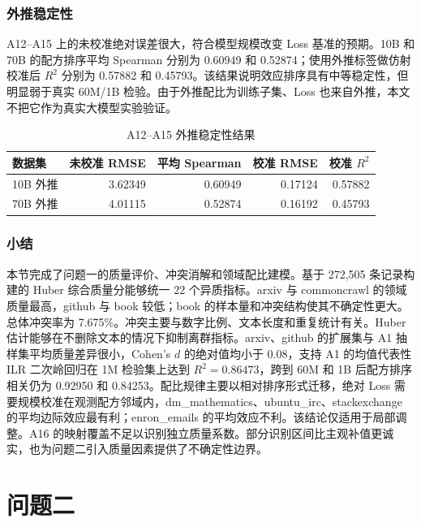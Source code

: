 \documentclass[bwprint]{gmcmthesis}
\numberwithin{equation}{section}
\numberwithin{figure}{section}
\numberwithin{table}{section}
\begin{document}
        \subsubsection{外推稳定性}   %
        A12--A15 上的未校准绝对误差很大，符合模型规模改变 Loss 基准的预期。10B 和 70B 的配方排序平均 Spearman 分别为 0.60949 和 0.52874；使用外推标签做仿射校准后 $R^2$ 分别为 0.57882 和 0.45793。该结果说明效应排序具有中等稳定性，但明显弱于真实 60M/1B 检验。由于外推配比为训练子集、Loss 也来自外推，本文不把它作为真实大模型实验验证。
        
        \begin{table}[H]
        \centering
        \caption{A12--A15 外推稳定性结果}  %
        \label{tab:extrapolation}
        \begin{tabular}{lrrrr}
        \toprule
        数据集 & 未校准 RMSE & 平均 Spearman & 校准 RMSE & 校准 $R^2$ \\
        \midrule
        10B 外推 & 3.62349 & 0.60949 & 0.17124 & 0.57882 \\
        70B 外推 & 4.01115 & 0.52874 & 0.16192 & 0.45793 \\
        \bottomrule
        \end{tabular}
        \end{table}


        \subsubsection{小结}  %
        本节完成了问题一的质量评价、冲突消解和领域配比建模。基于 272,505 条记录构建的 Huber 综合质量分能够统一 22 个异质指标。arxiv 与 commoncrawl 的领域质量最高，github 与 book 较低；book 的样本量和冲突结构使其不确定性更大。总体冲突率为 7.675\%。冲突主要与数字比例、文本长度和重复统计有关。Huber 估计能够在不删除文本的情况下抑制离群指标。arxiv、github 的扩展集与 A1 抽样集平均质量差异很小，Cohen's $d$ 的绝对值均小于 0.08，支持 A1 的均值代表性ILR 二次岭回归在 1M 检验集上达到 $R^2=0.86473$，跨到 60M 和 1B 后配方排序相关仍为 0.92950 和 0.84253。配比规律主要以相对排序形式迁移，绝对 Loss 需要规模校准在观测配方邻域内，dm\_mathematics、ubuntu\_irc、stackexchange 的平均边际效应最有利；enron\_emails 的平均效应不利。该结论仅适用于局部调整。A16 的映射覆盖不足以识别独立质量系数。部分识别区间比主观补值更诚实，也为问题二引入质量因素提供了不确定性边界。


\section{问题二}   %
\end{document}
